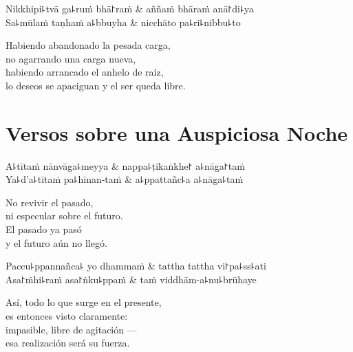 \begin{twochants}
Nikkhipi꜕tvā ga꜕ruṁ bhā꜓raṁ & aññaṁ bhāraṁ anā꜓di꜕ya \\
Sa꜕mūlaṁ taṇhaṁ a꜕bbuyha & nicchāto pa꜕ri꜕nibbu꜕to \\
\end{twochants}

\begin{english}
  Habiendo abandonado la pesada carga,\\
  no agarrando una carga nueva,\\
  habiendo arrancado el anhelo de raíz,\\
  lo deseos se apaciguan y el ser queda libre.
\end{english}

\chapter{Versos sobre una Auspiciosa Noche}


\begin{leader}
\end{leader}

\begin{twochants}
  A꜕tītaṁ nānvāga꜕meyya & nappa꜕ṭikaṅkhe꜓ a꜕nāga꜓taṁ \\
  Ya꜕d'a꜕tītaṁ pa꜕hīnan-taṁ & a꜕ppattañc꜕a a꜕nāga꜕taṁ \\
\end{twochants}

\begin{english}
  No revivir el pasado,\\
  ni especular sobre el futuro.\\
  El pasado ya pasó\\
  y el futuro aún no llegó.
\end{english}

\begin{twochants}
  Paccu꜕ppannañca꜕ yo dhammaṁ & tattha tattha vi꜓pa꜕ss꜕ati \\
  Asa꜓ṁhi꜕raṁ asa꜓ṅku꜕ppaṁ & taṁ viddhām-a꜕nu꜕brūhaye \\
\end{twochants}

\begin{english}
  Así, todo lo que surge en el presente,\\
  es entonces visto claramente:\\
  impasible, libre de agitación ---\\
  esa realización será su fuerza.
\end{english}

